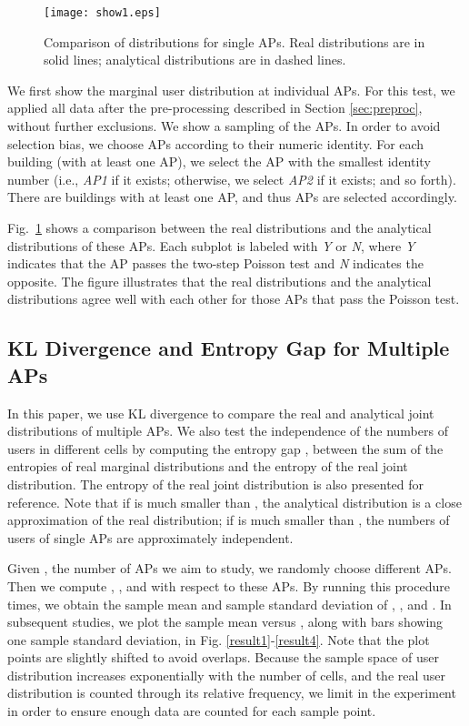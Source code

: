 \begin{figure}[t]
\centering  \vspace*{0pt}
\texttt{[image: show1.eps]}
\caption{Comparison of distributions for single APs. Real distributions  are in solid lines; analytical distributions are in dashed lines.}
\label{SD1}
\end{figure}



We first show the marginal user distribution at individual APs.   For this test, we applied all data after the pre-processing described in Section \ref{sec:preproc}, without further exclusions.
We show a sampling of the  APs. In order to avoid selection bias, we choose APs according to their numeric identity. For each building (with at least one AP), we select the AP with the smallest identity number (i.e., \emph{AP1} if it exists; otherwise, we select \emph{AP2} if it exists; and so forth). There are  buildings with at least one AP, and thus  APs are selected accordingly.

Fig.~\ref{SD1} shows a comparison between the real distributions and the analytical distributions of these APs.  Each subplot is labeled with \emph{Y} or \emph{N}, where \emph{Y} indicates that the AP passes the two-step Poisson test and \emph{N} indicates the opposite.
The figure illustrates that the real distributions and the analytical distributions agree well with each other for those APs that pass the Poisson test.




\subsection{KL Divergence and Entropy Gap for Multiple APs}


 In this paper,   we use KL  divergence  to compare the real and analytical joint distributions of multiple APs.
We also test the independence of the numbers of users in different cells by computing
the entropy gap , between  the sum of the entropies of real marginal distributions and the entropy of the real joint distribution. The entropy of the real joint distribution  is also presented for reference. {Note that if  is much smaller than , the analytical distribution  is a close approximation of the real distribution; if  is much smaller than , the numbers of users of single APs are approximately independent.}


Given , the number of APs we aim to study, we randomly choose  different APs. Then we compute , , and  with respect to these APs.  By running this procedure  times, we obtain the sample mean and sample standard deviation of , , and .   In subsequent studies, we plot the sample mean versus , along with bars showing one sample standard deviation, in Fig. \ref{result1}-\ref{result4}.  Note that the plot points are slightly shifted to avoid overlaps. Because the sample space of user distribution increases exponentially with the number of cells, and the real user distribution is counted through its relative frequency, we limit  in the experiment in order to ensure enough data are counted for each sample point.



